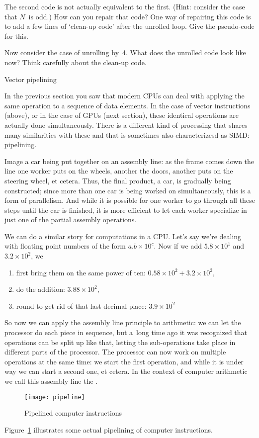 \begin{exercise}
  The second code is not actually equivalent to the first. (Hint:
  consider the case that $N$~is odd.) How can you repair that code?
  One way of repairing this code is to add a few lines of `clean-up code'
  after the unrolled loop. Give the pseudo-code for this.

  Now consider the case of unrolling by~4. What does the unrolled code
  look like now? Think carefully about the clean-up code.
\end{exercise}

 {Vector pipelining}
\label{sec:pipeline}

In the previous section you saw that modern CPUs can deal with
applying the same operation to a sequence of data elements.  In the
case of vector instructions (above), or in the case of GPUs (next
section), these identical operations are
actually done simultaneously. There is a different
kind of processing that shares many similarities with these
and that is sometimes also characterizesd as \ac{SIMD}:
pipelining.

Image a car being put together on an assembly line: as the frame comes
down the line one worker puts on the wheels, another the doors,
another puts on the steering wheel, et cetera. Thus, the final
product, a car, is gradually being constructed; since more than one
car is being worked on simultaneously, this is a form of
parallelism. And while it is
possible for one worker to go through all these steps
until the car is finished, it is more efficient to let each worker
specialize in just one of the partial assembly operations.

We can do a similar story for computations in a CPU. Let's say we're
dealing with floating point numbers of the form $a.b\times 10^c$.  Now
if we add $5.8\times 10^1$ and $3.2\times 10^2$, we
\begin{enumerate}
\item first bring them on the same power of ten: $0.58\times
  10^2+3.2\times 10^2$,
\item do the addition: $3.88\times 10^2$,
\item round to get rid of that last decimal place: $3.9\times 10^2$
\end{enumerate}
So now we can apply the assembly line principle to arithmetic: 
we can let the processor do each piece in sequence, but
a~long time ago it was recognized that operations can be split up like that,
letting the sub-operations take place in different parts of the processor.
%
The processor can now work on multiple operations at the same time: we
start the first operation, and while it is under way we can start a
second one, et cetera.  In the context of computer arithmetic we call
this assembly line the .
\begin{figure}[ht]
  \texttt{[image: pipeline]}
  \caption{Pipelined computer instructions}
  \label{fig:pipeline}
\end{figure}
Figure~\ref{fig:pipeline} illustrates some actual pipelining of computer
instructions.

